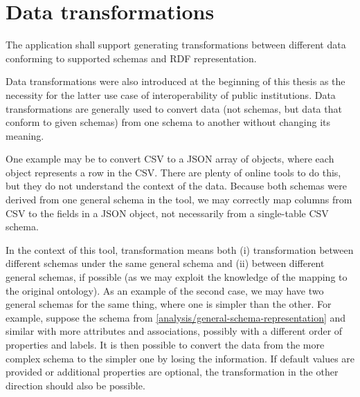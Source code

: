\section{Data transformations}

\begin{requirement}
    The application shall support generating transformations between different data conforming to supported schemas and RDF representation.
    \label{req:transformations}
\end{requirement}

Data transformations were also introduced at the beginning of this thesis as the necessity for the latter use case of interoperability of public institutions. Data transformations are generally used to convert data (not schemas, but data that conform to given schemas) from one schema to another without changing its meaning.

One example may be to convert CSV to a JSON array of objects, where each object represents a row in the CSV. There are plenty of online tools to do this, but they do not understand the context of the data. Because both schemas were derived from one general schema in the tool, we may correctly map columns from CSV to the fields in a JSON object, not necessarily from a single-table CSV schema.

In the context of this tool, transformation means both (i) transformation between different schemas under the same general schema and (ii) between different general schemas, if possible (as we may exploit the knowledge of the mapping to the original ontology). As an example of the second case, we may have two general schemas for the same thing, where one is simpler than the other. For example, suppose the schema from \autoref{analysis/general-schema-representation} and similar with more attributes and associations, possibly with a different order of properties and labels. It is then possible to convert the data from the more complex schema to the simpler one by losing the information. If default values are provided or additional properties are optional, the transformation in the other direction should also be possible.

\medskip

